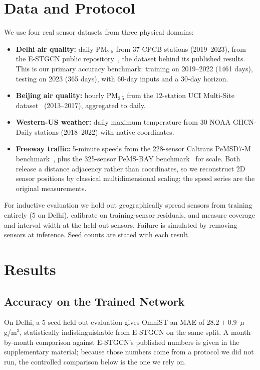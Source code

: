 \documentclass[journal,twoside,web]{ieeecolor}
\begin{document}
\section{Data and Protocol}
\label{sec:experiments}

We use four real sensor datasets from three physical domains:
\begin{itemize}
\item \textbf{Delhi air quality:} daily PM$_{2.5}$ from 37 CPCB stations (2019--2023), from the
E-STGCN public repository~\cite{panja2026estgcn}, the dataset behind its published results. This is
our primary accuracy benchmark: training on 2019--2022 (1461 days), testing on 2023 (365 days), with
60-day inputs and a 30-day horizon.
\item \textbf{Beijing air quality:} hourly PM$_{2.5}$ from the 12-station UCI Multi-Site
dataset~\cite{zhang2017beijingair} (2013--2017), aggregated to daily.
\item \textbf{Western-US weather:} daily maximum temperature from 30 NOAA GHCN-Daily stations
(2018--2022) with native coordinates.
\item \textbf{Freeway traffic:} 5-minute speeds from the 228-sensor Caltrans PeMSD7-M
benchmark~\cite{yu2018stgcn}, plus the 325-sensor PeMS-BAY benchmark~\cite{li2018dcrnn} for scale.
Both release a distance adjacency rather than coordinates, so we reconstruct 2D sensor positions by
classical multidimensional scaling; the speed series are the original measurements.
\end{itemize}

For inductive evaluation we hold out geographically spread sensors from training entirely (5 on
Delhi), calibrate on training-sensor residuals, and measure coverage and interval width at the
held-out sensors. Failure is simulated by removing sensors at inference. Seed counts are stated with
each result.

\section{Results}
\label{sec:results}

\subsection{Accuracy on the Trained Network}

On Delhi, a 5-seed held-out evaluation gives OmniST an MAE of $28.2\pm0.9$~$\mu$g/m$^3$, statistically
indistinguishable from E-STGCN on the same split. A month-by-month comparison against E-STGCN's
published numbers is given in the supplementary material; because those numbers come from a protocol
we did not run, the controlled comparison below is the one we rely on.
\end{document}
